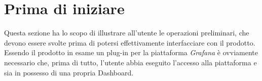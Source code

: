 \section{Prima di iniziare}\label{Prima}

Questa sezione ha lo scopo di illustrare all'utente le operazioni preliminari, che devono essere svolte prima di potersi effettivamente interfacciare con il prodotto.\\
Essendo il prodotto in esame un plug-in per la piattaforma \textit{Grafana} è ovviamente necessario che, prima di tutto, l'utente abbia eseguito l'accesso alla piattaforma e sia in possesso di una propria Dashboard\glossario.



\pagebreak
